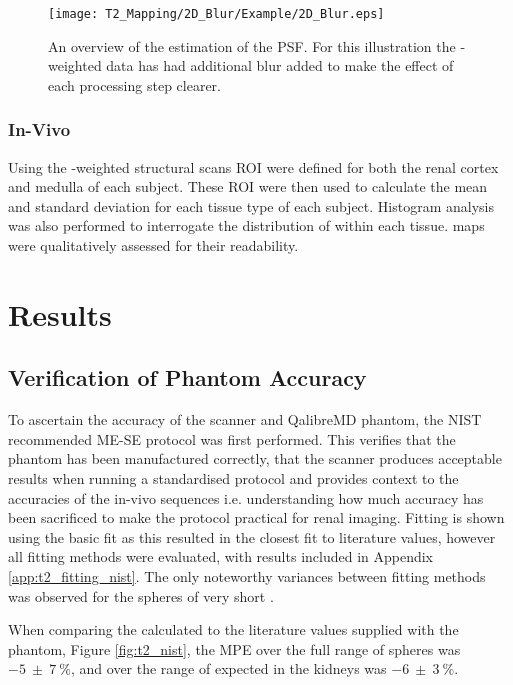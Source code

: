 \begin{figure}[H]
	\centering
	\texttt{[image: T2\_Mapping/2D\_Blur/Example/2D\_Blur.eps]}
	\caption{An overview of the estimation of the \ac{PSF}. For this illustration the \ttwo-weighted data has had additional blur added to make the effect of each processing step clearer.}
	\label{fig:t2_2d_blur}	
\end{figure}

\subsubsection{In-Vivo}

Using the \tone-weighted structural scans \ac{ROI} were defined for both the renal cortex and medulla of each subject. These \ac{ROI} were then used to calculate the mean and standard deviation \ttwo for each tissue type of each subject. Histogram analysis was also performed to interrogate the distribution of \ttwo within each tissue. \ttwo maps were qualitatively assessed for their readability.

\newpage

\section{Results}

\subsection{Verification of Phantom Accuracy}
To ascertain the accuracy of the scanner and QalibreMD phantom, the \ac{NIST} recommended ME-SE protocol was first performed. This verifies that the phantom has been manufactured correctly, that the scanner produces acceptable results when running a standardised protocol and provides context to the accuracies of the in-vivo sequences i.e. understanding how much accuracy has been sacrificed to make the protocol practical for renal imaging. Fitting is shown using the basic fit as this resulted in the closest fit to literature values, however all fitting methods were evaluated, with results included in Appendix \ref{app:t2_fitting_nist}. The only noteworthy variances between fitting methods was observed for the spheres of very short \ttwo.

When comparing the \ttwo calculated to the literature values supplied with the phantom, Figure \ref{fig:t2_nist}, the \ac{MPE} over the full range of spheres was $-5~\pm~7~\%$, and over the range of \ttwo expected in the kidneys was $-6~\pm~3~\%$. 

